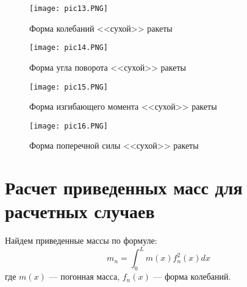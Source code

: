 \begin{figure}[H]
    \begin{center}
        \texttt{[image: pic13.PNG]}
        \caption{Форма колебаний <<сухой>> ракеты}
        \label{pic13}
    \end{center}
\end{figure}
\begin{figure}[H]
    \begin{center}
        \texttt{[image: pic14.PNG]}
        \caption{Форма угла поворота <<сухой>> ракеты}
        \label{pic14}
    \end{center}
\end{figure}
\begin{figure}[H]
    \begin{center}
        \texttt{[image: pic15.PNG]}
        \caption{Форма изгибающего момента <<сухой>> ракеты}
        \label{pic15}
    \end{center}
\end{figure}
\begin{figure}[H]
    \begin{center}
        \texttt{[image: pic16.PNG]}
        \caption{Форма поперечной силы <<сухой>> ракеты}
        \label{pic16}
    \end{center}
\end{figure}

\section{Расчет приведенных масс для расчетных случаев}

Найдем приведенные массы по формуле:
\begin{equation}
    \label{eq29}
    m_n = \int_{0}^{L} m(x) f_n^2(x) dx
\end{equation}
где $m(x)$ --- погонная масса, $f_n(x)$ --- форма колебаний.

